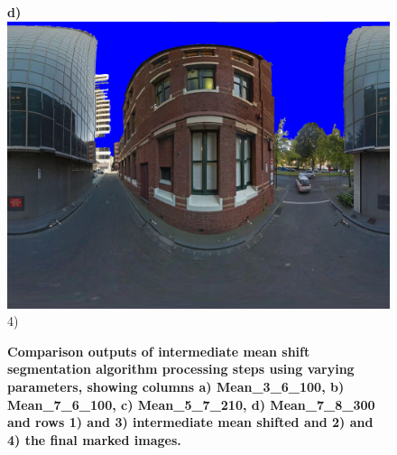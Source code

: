 \documentclass[final,3p,times,authoryear]{elsarticle}
\begin{document}
\begin{figure}
\textbf{d)}\includegraphics[scale=0.08]{Images/mean/0070_7_8_300_ms_sky_mark.png} 4)

\caption{\bf Comparison outputs of intermediate mean shift segmentation algorithm processing steps using varying parameters, showing columns a) Mean\_3\_6\_100, b) Mean\_7\_6\_100, c) Mean\_5\_7\_210, d) Mean\_7\_8\_300 and rows 1) and 3) intermediate mean shifted and 2) and 4) the final marked images. }
 \label{fig:meantypes}  
\end{figure} 
\end{document}
